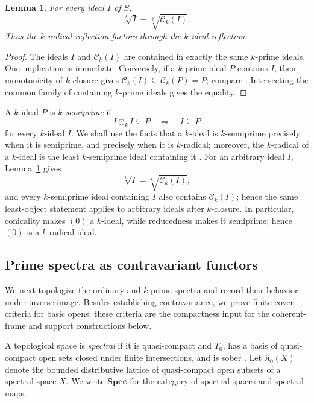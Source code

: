 \documentclass[12pt,leqno]{amsart}
\newcommand{\SpecSp}{\mathbf{Spec}}
\newcommand{\KOpen}{\mathfrak K_{0}}
\newtheorem{lemma}[theorem]{Lemma}
\theoremstyle{definition}
\numberwithin{equation}{section}
\theoremstyle{remark}
\begin{document}
\begin{lemma}\label{lem:k-radical-k-closure}
For every ideal $I$ of $S$,
\[
\sqrt[k]{I}=\sqrt[k]{\mathcal C_k(I)}.
\]
Thus the $k$-radical reflection factors through the $k$-ideal reflection.
\end{lemma}

\begin{proof}
The ideals $I$ and \(\mathcal C_k(I)\) are contained in exactly the same $k$-prime ideals. One implication is immediate. Conversely, if a $k$-prime ideal $P$ contains $I$, then monotonicity of $k$-closure gives
\(\mathcal C_k(I)\subseteq\mathcal C_k(P)=P\); compare \cite[Lemma~2.1(5)]{AG24}. Intersecting the common family of containing $k$-prime ideals gives the equality.
\end{proof}

A $k$-ideal $P$ is \emph{$k$-semiprime} if
\[
I\odot_k I\subseteq P\quad\Longrightarrow\quad I\subseteq P
\]
for every $k$-ideal $I$. We shall use the facts that a $k$-ideal is $k$-semiprime precisely when it is semiprime, and precisely when it is $k$-radical; moreover, the $k$-radical of a $k$-ideal is the least $k$-semiprime ideal containing it \cite[Proposition~3.8, Theorem~3.14, Corollary~3.15]{AG24}. For an arbitrary ideal $I$, Lemma~\ref{lem:k-radical-k-closure} gives
\[
\sqrt[k]{I}=\sqrt[k]{\mathcal C_k(I)},
\]
and every $k$-semiprime ideal containing $I$ also contains \(\mathcal C_k(I)\); hence the same least-object statement applies to arbitrary ideals after $k$-closure. In particular, conicality makes $(0)$ a $k$-ideal, while reducedness makes it semiprime; hence $(0)$ is a $k$-radical ideal.

\subsection{Prime spectra as contravariant functors}

We next topologize the ordinary and $k$-prime spectra and record their behavior under inverse image. Besides establishing contravariance, we prove finite-cover criteria for basic opens; these criteria are the compactness input for the coherent-frame and support constructions below.

A topological space is \emph{spectral} if it is quasi-compact and $T_0$, has a basis of quasi-compact open sets closed under finite intersections, and is sober \cite{Hochster,SpectralBook}. Let \(\KOpen(X)\) denote the bounded distributive lattice of quasi-compact open subsets of a spectral space $X$. We write \(\SpecSp\) for the category of spectral spaces and spectral maps.
\end{document}

